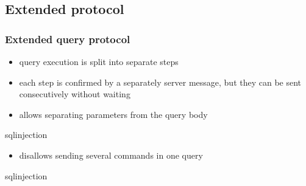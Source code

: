 \documentclass{beamer}
\begin{document}
\subsection{Extended protocol}
\begin{frame}
  \frametitle{Extended query protocol}

  \begin{itemize}
  \item query execution is split into separate steps
  \item each step is confirmed by a separately server message, but they can be
    sent consecutively without waiting
  \item allows separating parameters from the query body
  \end{itemize}
  \begin{beamercolorbox}[center,sep=1em]{sqlinjection}
  \end{beamercolorbox}

  \begin{itemize}
  \item disallows sending several commands in one query
  \end{itemize}

  \begin{beamercolorbox}[center,sep=1em]{sqlinjection}
  \end{beamercolorbox}
\end{frame}
\end{document}
